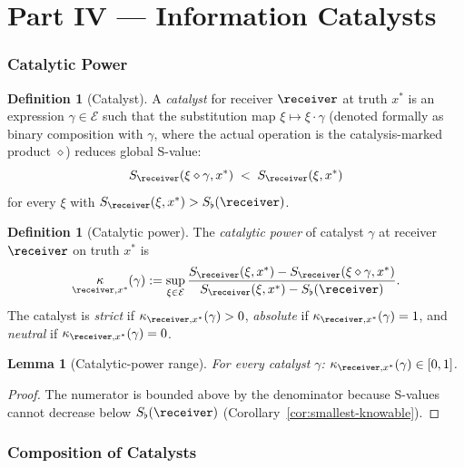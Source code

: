 \documentclass[11pt,a4paper]{article}
\theoremstyle{thmstyle}
\newtheorem{lemma}[theorem]{Lemma}
\theoremstyle{thmstyle}
\theoremstyle{definition}
\newtheorem{definition}[theorem]{Definition}
\theoremstyle{remark}
\DeclareMathOperator{\catpow}{\kappa}
\newcommand{\Expr}{\mathcal{E}}
\newcommand{\Sscalar}{S}
\newcommand{\Sfloor}{S_{\flat}}
\begin{document}
\part*{Part IV --- Information Catalysts}

\section{Catalytic Power}
\label{sec:catalytic-power}

\begin{definition}[Catalyst]\label{def:catalyst}
A \emph{catalyst} for receiver $\receiver$ at truth
$x^{*}$ is an expression $\gamma \in \Expr$ such that
the substitution map
$\xi \mapsto \xi \cdot \gamma$ (denoted formally as
binary composition with $\gamma$, where the actual
operation is the catalysis-marked product
$\diamond$) reduces global S-value:
\[
\Sscalar_{\receiver}(\xi \diamond \gamma, x^{*})
\;<\; \Sscalar_{\receiver}(\xi, x^{*})
\]
for every $\xi$ with $\Sscalar_{\receiver}(\xi, x^{*})
> \Sfloor(\receiver)$.
\end{definition}

\begin{definition}[Catalytic power]\label{def:catalytic-power}
The \emph{catalytic power} of catalyst $\gamma$ at
receiver $\receiver$ on truth $x^{*}$ is
\[
\catpow_{\receiver, x^{*}}(\gamma)
:= \sup_{\xi \in \Expr}
\frac{\Sscalar_{\receiver}(\xi, x^{*})
       - \Sscalar_{\receiver}(\xi \diamond \gamma, x^{*})}
     {\Sscalar_{\receiver}(\xi, x^{*}) - \Sfloor(\receiver)}.
\]
The catalyst is \emph{strict} if
$\catpow_{\receiver, x^{*}}(\gamma) > 0$, \emph{absolute} if
$\catpow_{\receiver, x^{*}}(\gamma) = 1$, and \emph{neutral}
if $\catpow_{\receiver, x^{*}}(\gamma) = 0$.
\end{definition}

\begin{lemma}[Catalytic-power range]\label{lem:cat-power-range}
For every catalyst $\gamma$:
$\catpow_{\receiver, x^{*}}(\gamma) \in [0, 1]$.
\end{lemma}

\begin{proof}
The numerator is bounded above by the denominator
because S-values cannot decrease below $\Sfloor(\receiver)$
(Corollary~\ref{cor:smallest-knowable}).
\end{proof}

\section{Composition of Catalysts}
\label{sec:composition-catalysts}
\end{document}
